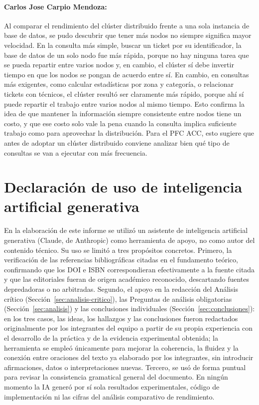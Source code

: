 \documentclass[11pt,a4paper]{article}
\begin{document}
\paragraph{Carlos Jose Carpio Mendoza:} Al comparar el rendimiento del clúster distribuido frente a una sola instancia de base de datos, se pudo descubrir que tener más nodos no siempre significa mayor velocidad. En la consulta más simple, buscar un ticket por su identificador, la base de datos de un solo nodo fue más rápida, porque no hay ninguna tarea que se pueda repartir entre varios nodos y, en cambio, el clúster sí debe invertir tiempo en que los nodos se pongan de acuerdo entre sí. En cambio, en consultas más exigentes, como calcular estadísticas por zona y categoría, o relacionar tickets con técnicos, el clúster resultó ser claramente más rápido, porque ahí sí puede repartir el trabajo entre varios nodos al mismo tiempo. Esto confirma la idea de que mantener la información siempre consistente entre nodos tiene un costo, y que ese costo solo vale la pena cuando la consulta implica suficiente trabajo como para aprovechar la distribución. Para el PFC ACC, esto sugiere que antes de adoptar un clúster distribuido conviene analizar bien qué tipo de consultas se van a ejecutar con más frecuencia.

\section*{Declaración de uso de inteligencia artificial generativa}
\label{sec:declaracion-ia}

En la elaboración de este informe se utilizó un asistente de inteligencia
artificial generativa (Claude, de Anthropic) como herramienta de apoyo, no
como autor del contenido técnico. Su uso se limitó a tres propósitos
concretos. Primero, la verificación de las referencias bibliográficas
citadas en el fundamento teórico, confirmando que los DOI e ISBN
correspondieran efectivamente a la fuente citada y que las editoriales
fueran de origen académico reconocido, descartando fuentes depredadoras o no
arbitradas. Segundo, el apoyo en la redacción del Análisis crítico
(Sección~\ref{sec:analisis-critico}), las Preguntas de análisis obligatorias
(Sección~\ref{sec:analisis}) y las conclusiones individuales
(Sección~\ref{sec:conclusiones}): en los tres casos, las ideas, los
hallazgos y las conclusiones fueron redactados originalmente por los
integrantes del equipo a partir de su propia experiencia con el desarrollo
de la práctica y de la evidencia experimental obtenida; la herramienta se
empleó únicamente para mejorar la coherencia, la fluidez y la conexión entre
oraciones del texto ya elaborado por los integrantes, sin introducir
afirmaciones, datos o interpretaciones nuevas. Tercero, se usó de forma
puntual para revisar la consistencia gramatical general del documento. En
ningún momento la IA generó por sí sola resultados experimentales, código de
implementación ni las cifras del análisis comparativo de rendimiento.

\clearpage
\printbibliography
\end{document}
